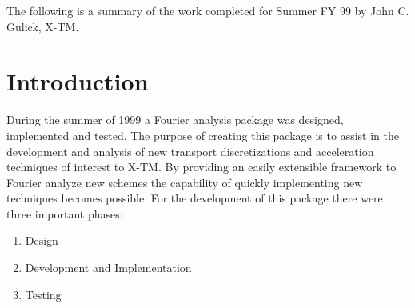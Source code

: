\documentclass[11pt]{rnote}
\begin{document}

\subject{Summary of Completed Work for John C. Gulick}

\date{August 27, 1999}



\distribution {}


\opening

\noindent
The following is a summary of the work completed for Summer FY 99 by
John C. Gulick, X-TM.
\section{Introduction}
\noindent
During the summer of 1999 a Fourier analysis package was designed,
implemented and tested.  The purpose of creating this package is to assist in
the development and analysis of new transport discretizations and
acceleration techniques of interest to X-TM.  By providing an easily
extensible framework to Fourier analyze new schemes the capability of
quickly implementing new techniques becomes possible.  For the development of this
package there were three important phases:
\begin{enumerate}
 \item Design
 \item Development and Implementation
 \item Testing
\end{enumerate}
\end{document}
